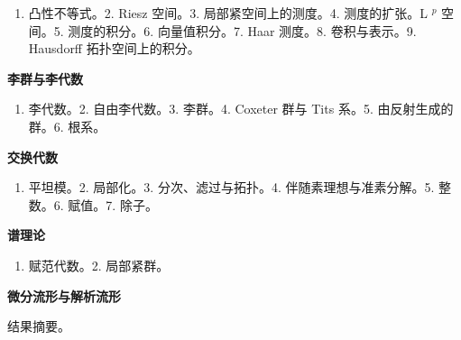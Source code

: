 \begin{enumerate}
\def\labelenumi{\arabic{enumi}.}
\tightlist
\item
  凸性不等式。2. Riesz 空间。3. 局部紧空间上的测度。4. 测度的扩张。L \(^{p}\) 空间。5. 测度的积分。6. 向量值积分。7. Haar 测度。8. 卷积与表示。9. Hausdorff 拓扑空间上的积分。
\end{enumerate}


\textbf{李群与李代数}\par

\begin{enumerate}
\def\labelenumi{\arabic{enumi}.}
\tightlist
\item
  李代数。2. 自由李代数。3. 李群。4. Coxeter 群与 Tits 系。5. 由反射生成的群。6. 根系。
\end{enumerate}

\textbf{交换代数}\par

\begin{enumerate}
\def\labelenumi{\arabic{enumi}.}
\tightlist
\item
  平坦模。2. 局部化。3. 分次、滤过与拓扑。4. 伴随素理想与准素分解。5. 整数。6. 赋值。7. 除子。
\end{enumerate}

\textbf{谱理论}\par

\begin{enumerate}
\def\labelenumi{\arabic{enumi}.}
\tightlist
\item
  赋范代数。2. 局部紧群。
\end{enumerate}

\textbf{微分流形与解析流形}\par

结果摘要。

